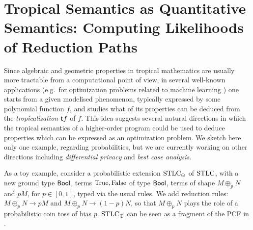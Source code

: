 \documentclass[submission,%
]{eptcs}
\begin{document}
\section{Tropical Semantics as Quantitative Semantics: Computing Likelihoods of Reduction Paths}

Since algebraic and geometric properties in tropical mathematics are usually more tractable from a computational point of view, in several well-known applications (e.g.~for optimization problems related to machine learning \cite{Pachter2004, Zhang2018, Maragos2021}) one starts from a given modelised phenomenon, typically expressed by some polynomial function $f$, and studies 
what of its properties can be deduced from the \emph{tropicalization} $\mathsf{t} f$ of $f$.
This idea suggests several natural directions in which the tropical semantics of a higher-order program could be used to deduce properties which can be expressed as an optimization problem.%
We sketch here only one example, regarding probabilities, but we are currently working on other directions including \emph{differential privacy} and \emph{best case analysis}.

As a toy example, consider a probabilistic extension $\mathrm{STLC}_\oplus$ of $\mathrm{STLC}$, with a new ground type $\mathsf{Bool}$, terms $\mathrm{True},\mathrm{False}$ of type $\mathsf{Bool}$, terms of shape $M\oplus_p N$ and $pM$, for $p\in[0,1]$, typed via the usual rules.
We add reduction rules:
$M\oplus_p N \to pM$ and $M\oplus_p N \to (1-p)N$,
so that $M\oplus_p N$ plays the role of a probabilistic coin toss of bias $p$.
$\mathrm{STLC}_\oplus$ can be seen as a fragment of the PCF in \cite{Manzo2013}.
\end{document}
